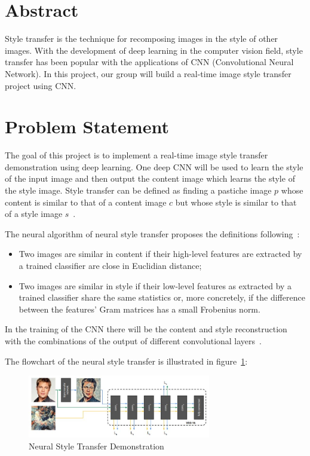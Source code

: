 \documentclass[11pt, a4paper]{article}
\begin{document}


\section{Abstract}

Style transfer is the technique for recomposing images in the style of other images. With the development of deep learning in the computer vision field, style transfer has been popular with the applications of CNN (Convolutional Neural Network). In this project, our group will build a real-time image style transfer project using CNN.

\section{Problem Statement}

The goal of this project is to implement a real-time image style transfer demonstration using deep learning. One deep CNN will be used to learn the style of the input image and then output the content image which learns the style of the style image. Style transfer can be defined as finding a pastiche image $p$ whose content is similar to that of a content image $c$ but whose style is similar to that of a style image $s$~\cite{ref:source1}. 

The neural algorithm of neural style transfer proposes the definitions following~\cite{ref:source1}:

\begin{itemize}
\item Two images are similar in content if their high-level features are extracted by a trained classifier are close in Euclidian distance;
\item Two images are similar in style if their low-level features as extracted by a trained classifier
share the same statistics or, more concretely, if the difference between the features' Gram
matrices has a small Frobenius norm.
\end{itemize}

In the training of the CNN there will be the content and style reconstruction with the combinations of the output of different convolutional layers~\cite{ref:source2}.

The flowchart of the neural style transfer is illustrated in figure~\ref{fig:nst-demo}:

\begin{figure}[htbp]
	\centering %
	
	\includegraphics[width=8cm]{image1}
	\caption{Neural Style Transfer Demonstration~\cite{ref:source1}\cite{ref:source2}}
	\label{fig:nst-demo}
\end{figure}
\end{document}
